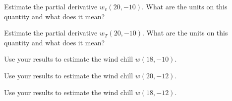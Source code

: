 \begin{activity}

\ba
\item Estimate the partial derivative $w_v(20,-10)$.  What are the
  units on this quantity and what does it mean?
\item Estimate the partial derivative $w_T(20,-10)$.  What are the
  units on this quantity and what does it mean?
\item Use your results to estimate the wind chill $w(18, -10)$.
\item Use your results to estimate the wind chill $w(20, -12)$.
\item Use your results to estimate the wind chill $w(18, -12)$.
\ea

\end{activity}

